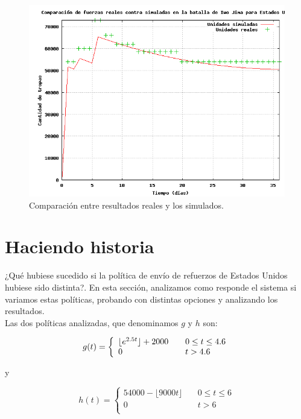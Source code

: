 \documentclass[a4paper,10pt]{article}
\begin{document}
\begin{figure}[h]
\begin{center}
\includegraphics[width=12cm]{real_vs_sim.png}
\caption{\label{fig:realvssim}Comparación entre resultados reales y los simulados.}
\end{center}
\end{figure}

\newpage

\section{Haciendo historia}

¿Qué hubiese sucedido si la política de envío de refuerzos de Estados Unidos hubiese sido distinta?. En esta sección, analizamos como 
responde el sistema si variamos estas políticas, probando con distintas opciones y analizando los resultados.\\
Las dos políticas analizadas, que denominamos $g$ y $h$ son:

\begin{equation}
g(t) = \left\{ 
    \begin{array}{l l}
    \lfloor e^{2.5t} \rfloor + 2000 & \quad 0 \leq t \leq 4.6 \\
    0 & \quad t > 4.6\\
    \end{array} \right.
    \end{equation}

y

\begin{equation}
h(t) = \left\{ 
    \begin{array}{ll}
    54000 - \lfloor 9000t \rfloor & \quad 0 \leq t \leq 6 \\
    0 & \quad t > 6\\
    \end{array} \right.
    \end{equation}
\end{document}
